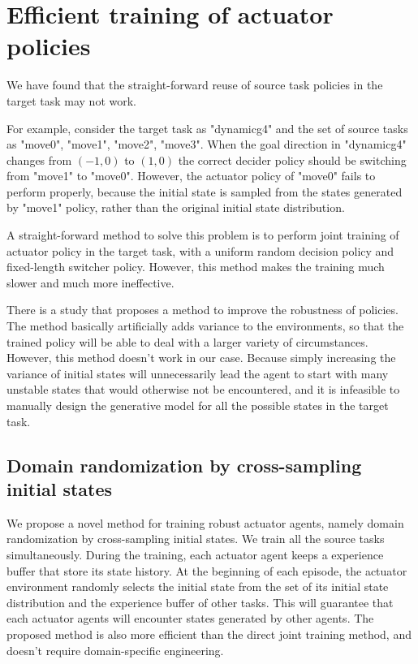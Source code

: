 
\section{Efficient training of actuator policies}
We have found that the straight-forward reuse of source task policies in the target task may not work.

For example, consider the target task as "dynamicg4" and the set of source tasks as "move0", "move1", "move2", "move3". When the goal direction in "dynamicg4" changes from $(-1,0)$ to $(1,0)$ the correct decider policy should be switching from "move1" to "move0". However, the actuator policy of "move0" fails to perform properly, because the initial state is sampled from the states generated by "move1" policy, rather than the original initial state distribution.

A straight-forward method to solve this problem is to perform joint training of actuator policy in the target task, with a uniform random decision policy and fixed-length switcher policy. However, this method makes the training much slower and much more ineffective.

There is a study \cite{tobin2017domain} that proposes a method to improve the robustness of policies. The method basically artificially adds variance to the environments, so that the trained policy will be able to deal with a larger variety of circumstances. However, this method doesn't work in our case. Because simply increasing the variance of initial states will unnecessarily lead the agent to start with many unstable states that would otherwise not be encountered, and it is infeasible to manually design the generative model for all the possible states in the target task.

\subsection{Domain randomization by cross-sampling initial states}
We propose a novel method for training robust actuator agents, namely domain randomization by cross-sampling initial states. We train all the source tasks simultaneously. During the training, each actuator agent keeps a experience buffer that store its state history. At the beginning of each episode, the actuator environment randomly selects the initial state from the set of its initial state distribution and the experience buffer of other tasks. This will guarantee that each actuator agents will encounter states generated by other agents. The proposed method is also more efficient than the direct joint training method, and doesn't require domain-specific engineering.